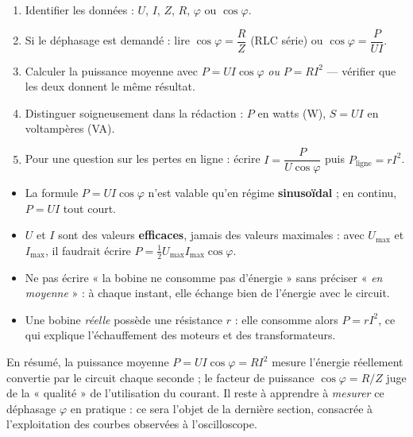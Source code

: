 \documentclass[11pt]{article}
\begin{document}
\begin{methode}
\begin{enumerate}
\item Identifier les données : $U$, $I$, $Z$, $R$, $\varphi$ ou $\cos\varphi$.
\item Si le déphasage est demandé : lire $\cos\varphi = \dfrac{R}{Z}$ (RLC série) ou $\cos\varphi = \dfrac{P}{UI}$.
\item Calculer la puissance moyenne avec $P = UI\cos\varphi$ \emph{ou} $P = RI^2$ — vérifier que les deux donnent le même résultat.
\item Distinguer soigneusement dans la rédaction : $P$ en watts (\si{W}), $S = UI$ en voltampères (\si{VA}).
\item Pour une question sur les pertes en ligne : écrire $I = \dfrac{P}{U\cos\varphi}$ puis $P_{\text{ligne}} = rI^2$.
\end{enumerate}
\end{methode}

\begin{attention}
\begin{itemize}
\item La formule $P = UI\cos\varphi$ n'est valable qu'en régime \textbf{sinusoïdal} ; en continu, $P = UI$ tout court.
\item $U$ et $I$ sont des valeurs \textbf{efficaces}, jamais des valeurs maximales : avec $U_{\max}$ et $I_{\max}$, il faudrait écrire $P = \tfrac{1}{2}U_{\max}I_{\max}\cos\varphi$.
\item Ne pas écrire « la bobine ne consomme pas d'énergie » sans préciser « \emph{en moyenne} » : à chaque instant, elle échange bien de l'énergie avec le circuit.
\item Une bobine \emph{réelle} possède une résistance $r$ : elle consomme alors $P = rI^2$, ce qui explique l'échauffement des moteurs et des transformateurs.
\end{itemize}
\end{attention}

En résumé, la puissance moyenne $P = UI\cos\varphi = RI^2$ mesure l'énergie réellement convertie par le circuit chaque seconde ; le facteur de puissance $\cos\varphi = R/Z$ juge de la « qualité » de l'utilisation du courant. Il reste à apprendre à \emph{mesurer} ce déphasage $\varphi$ en pratique : ce sera l'objet de la dernière section, consacrée à l'exploitation des courbes observées à l'oscilloscope.
\end{document}
